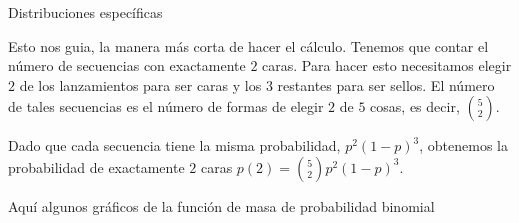 \documentclass[10pt]{beamer}
\begin{document}
\begin{frame}{Distribuciones espec\'ificas}
\small{Esto nos guia, la manera m\'as corta de hacer el c\'alculo. Tenemos que contar el n\'umero de secuencias con exactamente $2$ caras. Para hacer esto necesitamos elegir $2$ de los lanzamientos para ser caras y los $3$ restantes para ser sellos. El n\'umero de tales secuencias es el n\'umero de formas de  elegir $2$ de $5$ cosas, es decir, $\binom{5}{2}$.
	
Dado que cada secuencia tiene la misma probabilidad, $p^2(1 - p)^3$, obtenemos la probabilidad de exactamente $2$ caras $p(2) = \binom{5}{2}p^2(1 - p)^3$.


\vspace{0.3cm}
	
Aqu\'i algunos gr\'aficos de la  funci\'on de masa de probabilidad binomial}	


\end{frame}
\end{document}
